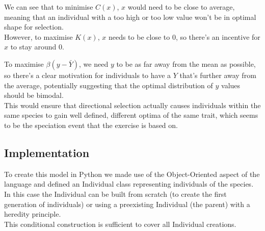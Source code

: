 \documentclass{article}
\begin{document}
We can see that to minimise $C(x)$, $x$ would need to be close to average, meaning that an individual with a too high or too low value won't be in optimal shape for selection. \\
However, to maximise $K(x)$, $x$ needs to be close to $0$, so there's an incentive for $x$ to stay around $0$.
\vspace{5mm}

To maximise $\beta(y-\bar{Y})$, we need $y$ to be as far away from the mean as possible, so there's a clear motivation for individuals to have a $Y$ that's further away from the average, potentially suggesting that the optimal distribution of $y$ values should be bimodal. \\
This would ensure that directional selection actually causes individuals within the same species to gain well defined, different optima of the same trait, which seems to be the speciation event that the exercise is based on.


\subsection{Implementation}



To create this model in Python we made use of the Object-Oriented aspect of the language and defined an Individual class representing individuals of the species. \\
In this case the Individual can be built from scratch (to create the first generation of individuals) or using a preexisting Individual (the parent) with a heredity principle. \\
\vspace{2mm}
This conditional construction is sufficient to cover all Individual creations. \\
\vspace{5mm}
\end{document}
